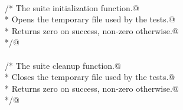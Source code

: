 \documentclass[12pt]{article}
\begin{document}
\begin{flushleft}
\begin{minipage}{\linewidth}
\begin{list}{}{}
\mbox{}\verb@@\\
\mbox{}\verb@/* The suite initialization function.@\\
\mbox{}\verb@ * Opens the temporary file used by the tests.@\\
\mbox{}\verb@ * Returns zero on success, non-zero otherwise.@\\
\mbox{}\verb@ */@\\
\mbox{}\verb@@\\
\mbox{}\verb@/* The suite cleanup function.@\\
\mbox{}\verb@ * Closes the temporary file used by the tests.@\\
\mbox{}\verb@ * Returns zero on success, non-zero otherwise.@\\
\mbox{}\verb@ */@\\
\mbox{}\verb@@\\
\mbox{}\verb@@{\NWsep}
\end{list}
\vspace{-1.5ex}
\footnotesize
\begin{list}{}{\setlength{\itemsep}{-\parsep}\setlength{\itemindent}{-\leftmargin}}

\item{}
\end{list}
\end{minipage}\vspace{4ex}
\end{flushleft}
\end{document}
